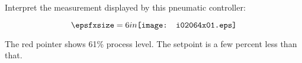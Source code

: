 

Interpret the measurement displayed by this pneumatic controller:

$$\epsfxsize=6in \texttt{[image: i02064x01.eps]}$$







The red pointer shows 61\% process level.  The setpoint is a few percent less than that.
 










